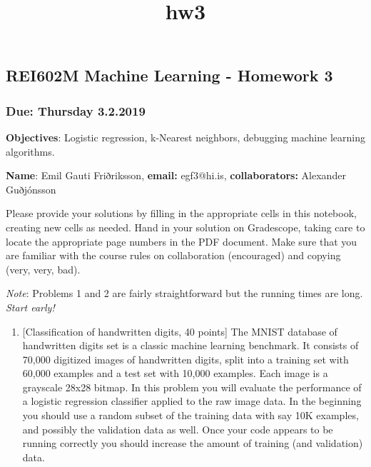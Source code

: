 \documentclass[11pt]{article}
\title{hw3}
\providecommand{\tightlist}{%
      \setlength{\itemsep}{0pt}\setlength{\parskip}{0pt}}
\begin{document}
    
    
    \maketitle
    
    

    
    \subsection{REI602M Machine Learning - Homework
3}\label{rei602m-machine-learning---homework-3}

\subsubsection{Due: Thursday 3.2.2019}\label{due-thursday-3.2.2019}

\textbf{Objectives}: Logistic regression, k-Nearest neighbors, debugging
machine learning algorithms.

\textbf{Name}: Emil Gauti Friðriksson, \textbf{email: } egf3@hi.is,
\textbf{collaborators:} Alexander Guðjónsson

Please provide your solutions by filling in the appropriate cells in
this notebook, creating new cells as needed. Hand in your solution on
Gradescope, taking care to locate the appropriate page numbers in the
PDF document. Make sure that you are familiar with the course rules on
collaboration (encouraged) and copying (very, very, bad).

\emph{Note}: Problems 1 and 2 are fairly straightforward but the running
times are long. \emph{Start early!}

    \begin{enumerate}
\def\labelenumi{\arabic{enumi})}
\tightlist
\item
  {[}Classification of handwritten digits, 40 points{]} The MNIST
  database of handwritten digits set is a classic machine learning
  benchmark. It consists of 70,000 digitized images of handwritten
  digits, split into a training set with 60,000 examples and a test set
  with 10,000 examples. Each image is a grayscale 28x28 bitmap. In this
  problem you will evaluate the performance of a logistic regression
  classifier applied to the raw image data. In the beginning you should
  use a random subset of the training data with say 10K examples, and
  possibly the validation data as well. Once your code appears to be
  running correctly you should increase the amount of training (and
  validation) data.
\end{enumerate}
\end{document}
